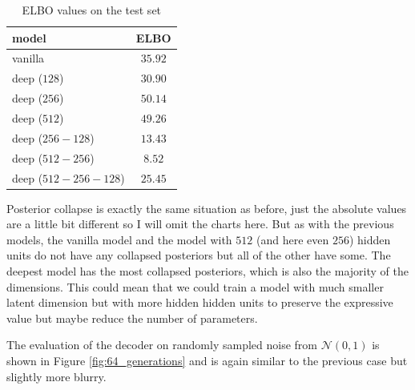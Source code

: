 \documentclass[a4paper,11pt]{article}
\begin{document}
\begin{table}[ht]
    \centering
    \begin{tabular}{| l | c |}
        \hline
        \textbf{model}       & \textbf{ELBO} \\
        \hline
        \hline
        vanilla              & $35.92$       \\
        \hline
        deep ($128$)         & $30.90$       \\
        \hline
        deep ($256$)         & $50.14$       \\
        \hline
        deep ($512$)         & $49.26$       \\
        \hline
        deep ($256-128$)     & $13.43$       \\
        \hline
        deep ($512-256$)     & $8.52$        \\
        \hline
        deep ($512-256-128$) & $25.45$       \\
        \hline
    \end{tabular}
    \caption{ELBO values on the test set}
    \label{tab:64_elbo}
\end{table}

Posterior collapse is exactly the same situation as before, just the absolute values are a little bit different so I will omit the charts here.
But as with the previous models, the vanilla model and the model with $512$ (and here even $256$) hidden units do not have any collapsed posteriors but all of the other have some.
The deepest model has the most collapsed posteriors, which is also the majority of the dimensions.
This could mean that we could train a model with much smaller latent dimension but with more hidden hidden units to preserve the expressive value but maybe reduce the number of parameters.

The evaluation of the decoder on randomly sampled noise from $\mathcal{N}(0, 1)$ is shown in Figure \ref{fig:64_generations} and is again similar to the previous case but slightly more blurry.
\end{document}
